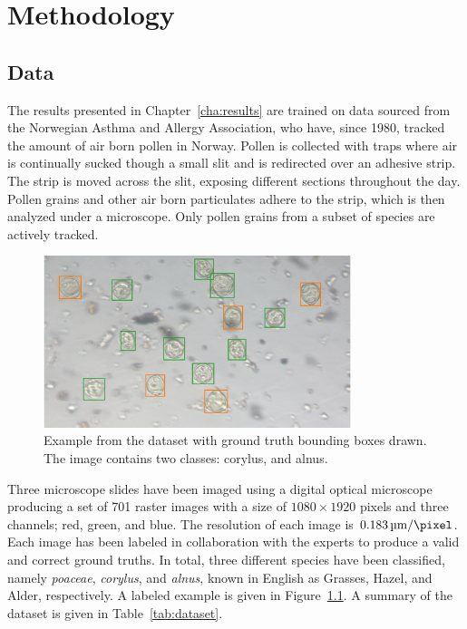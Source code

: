\chapter{Methodology}\label{cha:method}

\section{Data}\label{sec:dataset}
The results presented in Chapter~\ref{cha:results} are trained on data sourced from the Norwegian Asthma and Allergy Association, who have, since 1980, tracked the amount of air born pollen in Norway.
Pollen is collected with traps where air is continually sucked though a small slit and is redirected over an adhesive strip.
The strip is moved across the slit, exposing different sections throughout the day.
Pollen grains and other air born particulates adhere to the strip, which is then analyzed under a microscope.
Only pollen grains from a subset of species are actively tracked.

\begin{figure}[htbp]
  \centering
  \includegraphics[width=0.8\textwidth]{figs/Snap-057.png}
  \caption[Dataset example]{Example from the dataset with ground truth bounding boxes drawn. The image contains two classes: \textcolor{corylus}{corylus}, and \textcolor{alnus}{alnus}.}\label{fig:dataset-sample}
\end{figure}

Three microscope slides have been imaged using a digital optical microscope producing a set of 701 raster images with a size of \(1080\times 1920\) pixels and three channels; red, green, and blue.
The resolution of each image is \(\SI{0.183}{\micro\metre\per\pixel}\).
Each image has been labeled in collaboration with the experts to produce a valid and correct ground truths.
In total, three different species have been classified, namely \textit{poaceae}, \textit{corylus}, and \textit{alnus}, known in English as Grasses, Hazel, and Alder, respectively. A labeled example is given in Figure~\ref{fig:dataset-sample}. A summary of the dataset is given in Table~\ref{tab:dataset}.

